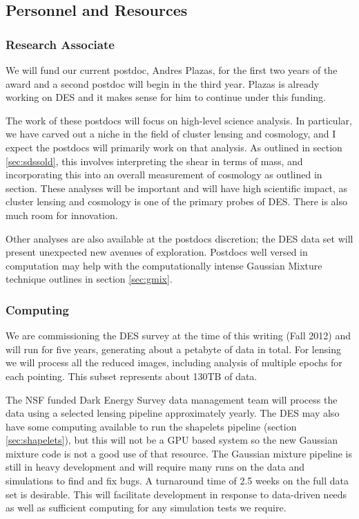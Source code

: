 \documentclass[12pt]{article}
\newcommand{\commissdate}{Fall 2012}
\begin{document}
\subsection{Personnel and Resources} \label{sec:resources}

\subsubsection{Research Associate}

We will fund our current postdoc, Andres Plazas, for the first two years of the
award and a second postdoc will begin in the third year.  Plazas is already
working on DES and it makes sense for him to continue under this funding.

The work of these postdocs will focus on high-level science analysis.  In
particular, we have carved out a niche in the field of cluster lensing and
cosmology, and I expect the postdocs will primarily work on that analysis.  As
outlined in section \ref{sec:sdssold}, this involves interpreting the shear in
terms of mass, and incorporating this into an overall measurement of cosmology
as outlined in section.  These analyses will be important and will have high
scientific impact, as cluster lensing and cosmology is one of the primary
probes of DES.  There is also much room for innovation.

Other analyses are also available at the postdocs discretion; the DES data set
will present unexpected new avenues of exploration.  Postdocs well versed in
computation may help with the computationally intense Gaussian Mixture
technique outlines in section \ref{sec:gmix}.

\subsubsection{Computing} \label{sec:computing}

We are commissioning the DES survey at the time of this writing (\commissdate)
and will run for five years, generating about a petabyte of data in total.  For
lensing we will process all the reduced images, including analysis of multiple
epochs for each pointing.  This subset represents about 130TB of data.

The NSF funded Dark Energy Survey data management team will process the data
using a selected lensing pipeline approximately yearly.  The DES may also have
some computing available to run the shapelets pipeline (section
\ref{sec:shapelets}), but this will not be a GPU based system so the new
Gaussian mixture code is not a good use of that resource.  The Gaussian mixture
pipeline is still in heavy development and will require many runs on the data
and simulations to find and fix bugs.  A turnaround time of 2.5 weeks on the
full data set is desirable.   This will facilitate development in response to
data-driven needs as well as sufficient computing for any simulation tests we
require.
\end{document}
